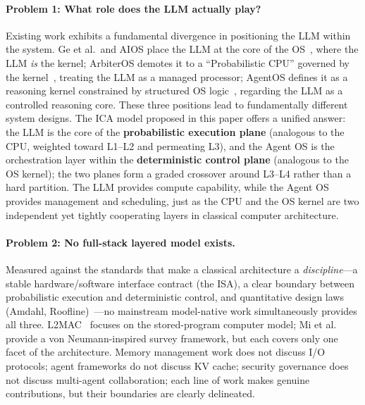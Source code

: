\paragraph{Problem 1: What role does the LLM actually play?}
Existing work exhibits a fundamental divergence in positioning the LLM within the system.
Ge et al.\ and AIOS place the LLM at the core of the OS~\cite{ge2023llmos,mei2024aios}, where the LLM \textit{is} the kernel;
ArbiterOS demotes it to a ``Probabilistic CPU'' governed by the kernel~\cite{arbiteros2025}, treating the LLM as a managed processor;
AgentOS defines it as a reasoning kernel constrained by structured OS logic~\cite{agentos2025}, regarding the LLM as a controlled reasoning core.
These three positions lead to fundamentally different system designs.
The ICA model proposed in this paper offers a unified answer: the LLM is the core of the \textbf{probabilistic execution plane} (analogous to the CPU, weighted toward L1--L2 and permeating L3), and the Agent OS is the orchestration layer within the \textbf{deterministic control plane} (analogous to the OS kernel); the two planes form a graded crossover around L3--L4 rather than a hard partition.
The LLM provides compute capability, while the Agent OS provides management and scheduling, just as the CPU and the OS kernel are two independent yet tightly cooperating layers in classical computer architecture.

\paragraph{Problem 2: No full-stack layered model exists.}
Measured against the standards that make a classical architecture a \emph{discipline}---a stable hardware/software interface contract (the ISA), a clear boundary between probabilistic execution and deterministic control, and quantitative design laws (Amdahl, Roofline)~\cite{hennessy2017quantitative}---no mainstream model-native work simultaneously provides all three.
L2MAC~\cite{holt2024l2mac} focuses on the stored-program computer model; Mi et al.~\cite{mi2025llmagentscomputersystems} provide a von Neumann-inspired survey framework, but each covers only one facet of the architecture.
Memory management work does not discuss I/O protocols; agent frameworks do not discuss KV cache; security governance does not discuss multi-agent collaboration; each line of work makes genuine contributions, but their boundaries are clearly delineated.

